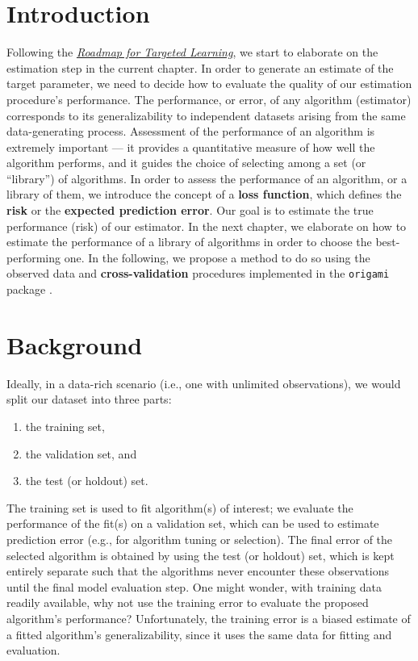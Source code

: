 \documentclass[
  12pt, krantz2,
]{krantz}
\newcommand{\passthrough}[1]{#1}
\providecommand{\tightlist}{%
  \setlength{\itemsep}{0pt}\setlength{\parskip}{0pt}}
\newcommand{\1}{\mathbbm{1}}
\theoremstyle{definition}
\theoremstyle{definition}
\theoremstyle{definition}
\theoremstyle{definition}
\theoremstyle{remark}
\begin{document}
\hypertarget{introduction-2}{%
\section{Introduction}\label{introduction-2}}

Following the \protect\hyperlink{roadmap}{\emph{Roadmap for Targeted Learning}}, we start to elaborate
on the estimation step in the current chapter. In order to generate an estimate
of the target parameter, we need to decide how to evaluate the quality of our
estimation procedure's performance. The performance, or error, of any algorithm
(estimator) corresponds to its generalizability to independent datasets arising
from the same data-generating process. Assessment of the performance of an
algorithm is extremely important --- it provides a quantitative measure of how
well the algorithm performs, and it guides the choice of selecting among a set
(or ``library'') of algorithms. In order to assess the performance of an
algorithm, or a library of them, we introduce the concept of a \textbf{loss
function}, which defines the \textbf{risk} or the \textbf{expected prediction error}.
Our goal is to estimate the true performance (risk) of our estimator. In the
next chapter, we elaborate on how to estimate the performance of a library of
algorithms in order to choose the best-performing one. In the following, we
propose a method to do so using the observed data and \textbf{cross-validation}
procedures implemented in the \passthrough{\lstinline!origami!} package \citep{coyle2018origami, coyle-cran-origami}.

\hypertarget{background}{%
\section{Background}\label{background}}

Ideally, in a data-rich scenario (i.e., one with unlimited observations), we
would split our dataset into three parts:

\begin{enumerate}
\def\labelenumi{\arabic{enumi}.}
\tightlist
\item
  the training set,
\item
  the validation set, and
\item
  the test (or holdout) set.
\end{enumerate}

The training set is used to fit algorithm(s) of interest; we evaluate the
performance of the fit(s) on a validation set, which can be used to estimate
prediction error (e.g., for algorithm tuning or selection). The final error of
the selected algorithm is obtained by using the test (or holdout) set, which is
kept entirely separate such that the algorithms never encounter these
observations until the final model evaluation step. One might wonder, with
training data readily available, why not use the training error to evaluate the
proposed algorithm's performance? Unfortunately, the training error is a biased
estimate of a fitted algorithm's generalizability, since it uses the same data
for fitting and evaluation.
\end{document}
